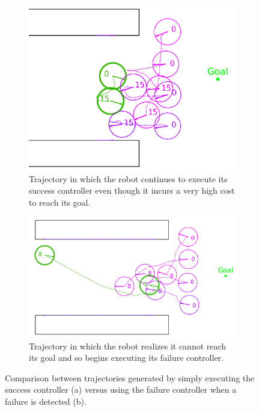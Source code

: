 \documentclass[letterpaper, 10 pt, conference]{ieeeconf}  %
\begin{document}
	\begin{figure}
		\centering
		\begin{subfigure}[t]{0.48\linewidth}
			\centering
			\includegraphics[width=\linewidth]{failure_without_failure_controller}
			\caption{Trajectory in which the robot continues to execute its success controller even though it incurs a very high cost to reach its goal.}
			\label{fig:failure_without_failure_controller}
		\end{subfigure}\hfill
		\begin{subfigure}[t]{0.48\linewidth}
			\centering
			\includegraphics[width=\linewidth]{failure_with_failure_controller}
			\caption{Trajectory in which the robot realizes it cannot reach its goal and so begins executing its failure controller.}
		\end{subfigure}
		\caption{Comparison between trajectories generated by simply executing the success controller (a) versus using the failure controller when a failure is detected (b).}
		\label{fig:experimentscomparison}
	\end{figure}
\end{document}
